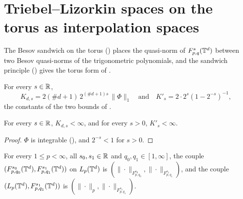 \section{Triebel--Lizorkin spaces on the torus as interpolation spaces}
\label{sec:torus-tl-interpolation}

The Besov sandwich on the torus () places the quasi-norm of
$F^{s}_{p,q}(\mathbb{T}^d)$ between two Besov quasi-norms of the trigonometric polynomials, and the
sandwich principle () gives the torus form of
.

\begin{definition}
\label{def:torus-tl-sandwich-consts}
\leanok
{}
For every $s \in \mathbb{R}$,
\[
  K_{d,s} = 2 (\#d + 1) \, 2^{(\#d + 1) s} \, \|\Phi\|_1
  \quad \text{and} \quad
  K'_s = 2 \cdot 2^s (1 - 2^{-s})^{-1} ,
\]
the constants of the two bounds of .
\end{definition}

\begin{lemma}
\label{lem:torus-tl-sandwich-consts-finite}
\leanok
{}
For every $s \in \mathbb{R}$, $K_{d,s} < \infty$, and for every $s > 0$, $K'_s < \infty$.
\end{lemma}

\begin{proof}
\leanok
$\Phi$ is integrable (), and $2^{-s} < 1$ for $s > 0$.
\end{proof}

\begin{definition}
\label{def:torus-tl-couples}
\leanok
{}
For every $1 \leq p < \infty$, all $s_0, s_1 \in \mathbb{R}$ and $q_0, q_1 \in [1, \infty]$, the couple
$(F^{s_0}_{p,q_0}(\mathbb{T}^d), F^{s_1}_{p,q_1}(\mathbb{T}^d))$ on $L_p(\mathbb{T}^d)$ is
$(\|\cdot\|_{F^{s_0}_{p,q_0}}, \|\cdot\|_{F^{s_1}_{p,q_1}})$, and the couple
$(L_p(\mathbb{T}^d), F^{s_1}_{p,q_1}(\mathbb{T}^d))$ is $(\|\cdot\|_p, \|\cdot\|_{F^{s_1}_{p,q_1}})$.
\end{definition}

